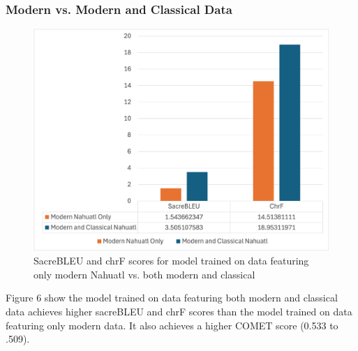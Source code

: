 \documentclass[10pt,twocolumn]{article}
\begin{document}
\subsubsection{Modern vs. Modern and Classical Data}

\begin{figure}
    \centering
    \includegraphics[width=.95\linewidth]{Dialect.png}
    \caption{
        SacreBLEU and chrF scores for model trained on data featuring only modern Nahuatl vs. both modern and classical
    }
    \label{fig:first-page}
\end{figure}

Figure 6 show the model trained on data featuring both modern and classical data achieves higher sacreBLEU and chrF scores than the model trained on data featuring only modern data. It also achieves a higher COMET score (0.533 to .509).
\end{document}
